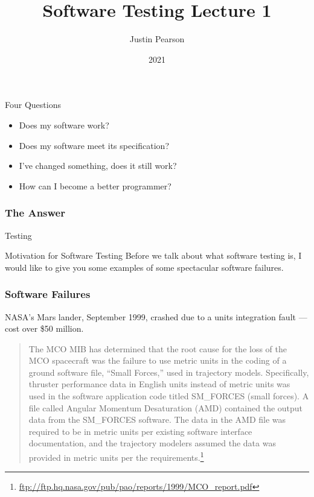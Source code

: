 \documentclass[handout]{beamer}
\title{Software Testing  Lecture 1}
\author{Justin Pearson}
\date{2021}
\begin{document}
\lstset{language=python}

\begin{frame}
  \maketitle
\end{frame}
\begin{frame}{Four Questions}
  \begin{itemize}
  \item Does my software work? \pause
  \item Does my software meet its specification? \pause
  \item I've changed something, does it still work? \pause
  \item How can I become a better programmer? 
  \end{itemize}
\end{frame}
\begin{frame}
  \frametitle{The Answer}
  \begin{center}
    {\Huge 
  Testing}
  \end{center}
\end{frame}
\begin{frame}{Motivation for Software Testing}
  Before we talk about what software testing is, I would like to give
  you some examples of some spectacular software failures.
  
  
\end{frame}
\begin{frame}
  \frametitle{Software Failures}

NASA's Mars lander, September 1999, crashed due to a units
    integration fault --- cost over  \$50 million.
    \begin{quote}
      The MCO MIB has determined that the root cause for the loss of
      the MCO spacecraft was the failure to use metric units in the
      coding of a ground software file, “Small Forces,” used in
      trajectory models. Specifically, thruster performance data in
      English units instead of metric units was used in the software
      application code titled SM\_FORCES (small forces). A file called
      Angular Momentum Desaturation (AMD) contained the output data
      from the SM\_FORCES software. The data in the AMD file was
      required to be in metric units per existing software interface
      documentation, and the trajectory modelers assumed the data was
      provided in metric units per the
      requirements.\footnote{\url{ftp://ftp.hq.nasa.gov/pub/pao/reports/1999/MCO_report.pdf}}
    \end{quote}  
\end{frame}
\end{document}

